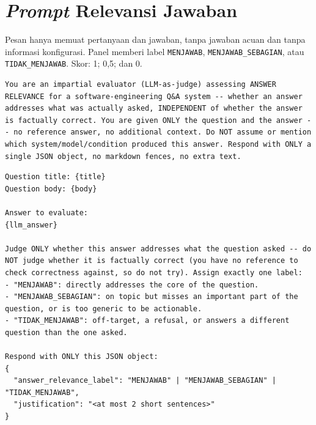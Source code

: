 \section{\emph{Prompt} Relevansi Jawaban}
\label{subsec:lamp-a3}

Pesan hanya memuat pertanyaan dan jawaban, tanpa jawaban acuan dan tanpa informasi konfigurasi. Panel memberi label \texttt{MENJAWAB}, \texttt{MENJAWAB\_\allowbreak{}SEBAGIAN}, atau \texttt{TIDAK\_\allowbreak{}MENJAWAB}. Skor: 1; 0,5; dan 0.


\begin{lstlisting}[caption={\emph{System prompt} relevansi jawaban.}, label={lst:ansrel-system}, frame=single, captionpos=t, language={}, basicstyle=\ttfamily\scriptsize, breaklines=true, breakatwhitespace=false, columns=fullflexible, keepspaces=true]
You are an impartial evaluator (LLM-as-judge) assessing ANSWER RELEVANCE for a software-engineering Q&A system -- whether an answer addresses what was actually asked, INDEPENDENT of whether the answer is factually correct. You are given ONLY the question and the answer -- no reference answer, no additional context. Do NOT assume or mention which system/model/condition produced this answer. Respond with ONLY a single JSON object, no markdown fences, no extra text.
\end{lstlisting}

\begin{lstlisting}[caption={\emph{User prompt} relevansi jawaban.}, label={lst:ansrel-user}, frame=single, captionpos=t, language={}, basicstyle=\ttfamily\scriptsize, breaklines=true, breakatwhitespace=false, columns=fullflexible, keepspaces=true]
Question title: {title}
Question body: {body}

Answer to evaluate:
{llm_answer}

Judge ONLY whether this answer addresses what the question asked -- do NOT judge whether it is factually correct (you have no reference to check correctness against, so do not try). Assign exactly one label:
- "MENJAWAB": directly addresses the core of the question.
- "MENJAWAB_SEBAGIAN": on topic but misses an important part of the question, or is too generic to be actionable.
- "TIDAK_MENJAWAB": off-target, a refusal, or answers a different question than the one asked.

Respond with ONLY this JSON object:
{
  "answer_relevance_label": "MENJAWAB" | "MENJAWAB_SEBAGIAN" | "TIDAK_MENJAWAB",
  "justification": "<at most 2 short sentences>"
}
\end{lstlisting}

